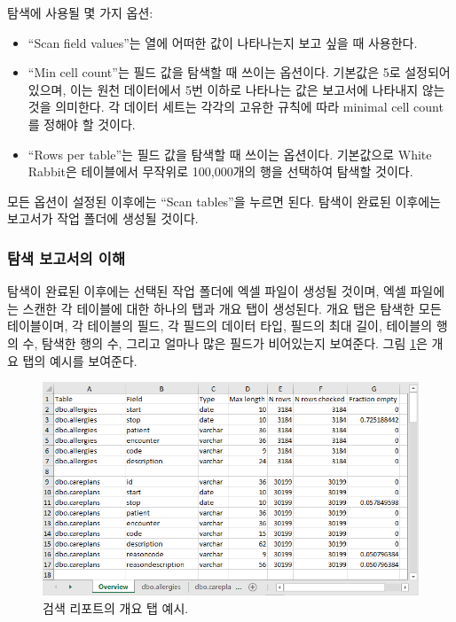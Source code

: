 \documentclass[10.5pt]{book}
\providecommand{\tightlist}{%
  \setlength{\itemsep}{0pt}\setlength{\parskip}{0pt}}
\theoremstyle{definition}
\theoremstyle{definition}
\theoremstyle{definition}
\theoremstyle{remark}
\begin{document}
탐색에 사용될 몇 가지 옵션:

\begin{itemize}
\tightlist
\item
  ``Scan field values''는 열에 어떠한 값이 나타나는지 보고 싶을 때
  사용한다.
\item
  ``Min cell count''는 필드 값을 탐색할 때 쓰이는 옵션이다. 기본값은 5로
  설정되어 있으며, 이는 원천 데이터에서 5번 이하로 나타나는 값은
  보고서에 나타내지 않는 것을 의미한다. 각 데이터 세트는 각각의 고유한
  규칙에 따라 minimal cell count를 정해야 할 것이다.
\item
  ``Rows per table''는 필드 값을 탐색할 때 쓰이는 옵션이다. 기본값으로
  White Rabbit은 테이블에서 무작위로 100,000개의 행을 선택하여 탐색할
  것이다.
\end{itemize}

모든 옵션이 설정된 이후에는 ``Scan tables''을 누르면 된다. 탐색이 완료된
이후에는 보고서가 작업 폴더에 생성될 것이다.

\subsubsection*{탐색 보고서의 이해}\label{--}

탐색이 완료된 이후에는 선택된 작업 폴더에 엑셀 파일이 생성될 것이며,
엑셀 파일에는 스캔한 각 테이블에 대한 하나의 탭과 개요 탭이 생성된다.
개요 탭은 탐색한 모든 테이블이며, 각 테이블의 필드, 각 필드의 데이터
타입, 필드의 최대 길이, 테이블의 행의 수, 탐색한 행의 수, 그리고 얼마나
많은 필드가 비어있는지 보여준다. 그림 \ref{fig:ScanOverviewTab}은 개요
탭의 예시를 보여준다.

\begin{figure}

{\centering \includegraphics[width=1\linewidth]{images/ExtractTransformLoad/ScanOverviewTab} 

}

\caption{검색 리포트의 개요 탭 예시.}\label{fig:ScanOverviewTab}
\end{figure}
\end{document}
